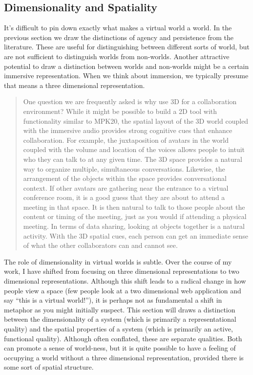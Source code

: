 \subsection{Dimensionality and Spatiality}

It's difficult to pin down exactly what makes a virtual world a world. In the previous section we draw the distinctions of agency and persistence from the literature. These are useful for distinguishing between different sorts of world, but are not sufficient to distinguish worlds from non-worlds. Another attractive potential to draw a distinction between worlds and non-worlds might be a certain immersive representation. When we think about immersion, we typically presume that means a three dimensional representation. 

\begin{quotation}
One question we are frequently asked is why use 3D for a collaboration environment? While it might be possible to build a 2D tool with functionality similar to MPK20, the spatial layout of the 3D world coupled with the immersive audio provides strong cognitive cues that enhance collaboration. For example, the juxtaposition of avatars in the world coupled with the volume and location of the voices allows people to intuit who they can talk to at any given time. The 3D space provides a natural way to organize multiple, simultaneous conversations. Likewise, the arrangement of the objects within the space provides conversational context. If other avatars are gathering near the entrance to a virtual conference room, it is a good guess that they are about to attend a meeting in that space. It is then natural to talk to those people about the content or timing of the meeting, just as you would if attending a physical meeting. In terms of data sharing, looking at objects together is a natural activity. With the 3D spatial cues, each person can get an immediate sense of what the other collaborators can and cannot see.\citep{Anonymous:tv}
\end{quotation}

The role of dimensionality in virtual worlds is subtle. Over the course of my work, I have shifted from focusing on three dimensional representations to two dimensional representations. Although this shift leads to a radical change in how people view a space (few people look at a two dimensional web application and say ``this is a virtual world!''), it is perhaps not as fundamental a shift in metaphor as you might initially suspect. This section will draws a distinction between the dimensionality of a system (which is primarily a representational quality) and the spatial properties of a system (which is primarily an active, functional quality). Although often conflated, these are separate qualities. Both can promote a sense of world-ness, but it is quite possible to have a feeling of occupying a world without a three dimensional representation, provided there is some sort of spatial structure.

